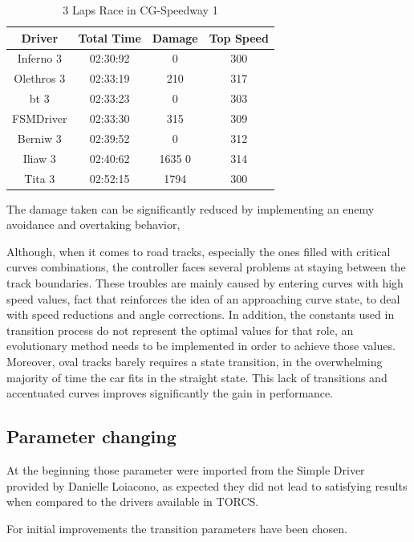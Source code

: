 \begin{table}[h]
\renewcommand{\arraystretch}{1.3}
\caption{3 Laps Race in CG-Speedway 1}
\label{table_4}
\centering
\begin{tabular}{c||c||c||c}
\hline  \bfseries Driver & \bfseries Total Time & \bfseries  Damage & \bfseries Top Speed \\ 
\hline Inferno 3 & 02:30:92 & 0 & 300 \\ 
\hline Olethros 3 & 02:33:19 & 210 & 317 \\  
\hline bt 3 & 02:33:23 & 0 & 303 \\  
\hline FSMDriver & 02:33:30 & 315 & 309 \\  
\hline Berniw 3 & 02:39:52 & 0 & 312 \\
\hline Iliaw 3 & 02:40:62 & 1635 0 & 314 \\
\hline Tita 3 & 02:52:15 & 1794 & 300 \\
\hline 
\end{tabular}
\end{table} 


The damage taken can be significantly reduced by implementing an enemy avoidance and overtaking behavior,

Although, when it comes to road tracks, especially the ones filled with critical curves combinations, the controller faces several problems at staying between the track boundaries. These troubles are mainly caused by entering curves with high speed values, fact that reinforces the idea of an approaching curve state, to deal with speed reductions and angle corrections. In addition, the constants used in transition process do not represent the optimal values for that role, an evolutionary method needs to be implemented in order to achieve those values. Moreover, oval tracks barely requires a state transition, in the overwhelming majority of time the car fits in the straight state. This lack of transitions and accentuated curves improves significantly the gain in performance.

\subsection{Parameter changing}
At the beginning those parameter were imported from the Simple Driver provided by Danielle Loiacono, as expected they did not lead to satisfying results when compared to the drivers available in TORCS.

For initial improvements the transition parameters have been chosen. 


